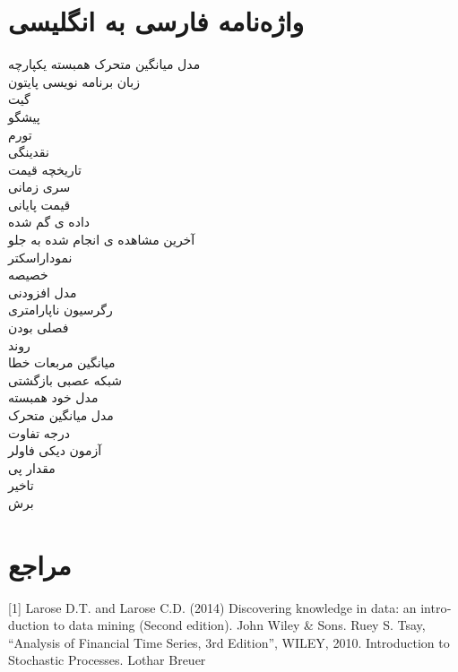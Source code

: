 \documentclass[12pt]{report}
\begin{document}
\chapter*{واژه‌نامه فارسی به انگلیسی}
مدل میانگین متحرک همبسته یکپارچه
\dotfill {} \\
زبان برنامه نویسی پایتون 
\dotfill {} \\
گیت
\dotfill {} \\
پیشگو
\dotfill {} \\
تورم
\dotfill {} \\
نقدینگی
\dotfill {} \\
تاریخچه قیمت
\dotfill {} \\
سری زمانی
\dotfill {} \\
قیمت پایانی
\dotfill {} \\
داده ی گم شده
\dotfill {} \\
آخرین مشاهده ی انجام شده به جلو
\dotfill {} \\
نموداراسکتر
\dotfill {} \\
خصیصه
\dotfill {} \\
مدل افزودنی
\dotfill {} \\
رگرسیون ناپارامتری
\dotfill {} \\
فصلی بودن
\dotfill {} \\
روند
\dotfill {} \\
میانگین مربعات خطا
\dotfill {} \\
شبکه عصبی بازگشتی
\dotfill {} \\
مدل خود همبسته
\dotfill {} \\
مدل میانگین متحرک
\dotfill {} \\
درجه تفاوت
\dotfill {} \\
آزمون دیکی فاولر
\dotfill {} \\
مقدار پی
\dotfill {} \\
تاخیر
\dotfill {} \\
برش
\dotfill {} \\

\chapter*{مراجع}
\begin{latin}
[1] Larose D.T. and Larose C.D. (2014) Discovering knowledge in data: an introduction to data mining (Second edition). John Wiley \& Sons.
\newline
\newline
[2] Ruey S. Tsay, “Analysis of Financial Time Series, 3rd Edition”, WILEY, 2010.
\newline
\newline
[3] Introduction to Stochastic Processes. Lothar Breuer 
\newline
\end{latin}
\end{document}
